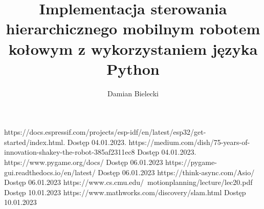 \documentclass[12pt,twoside]{article}
\author{Damian Bielecki}
\title{Implementacja sterowania hierarchicznego mobilnym robotem kołowym z wykorzystaniem języka Python}
\begin{document}
\maketitle

\blankpage

\tableofcontents
\clearpage
\blankpage










	


\clearpage
	
	
\begin{thebibliography}{4}
	 https://docs.espressif.com/projects/esp-idf/en/latest/esp32/get-started/index.html. Dostęp 04.01.2023.
	 https://medium.com/dish/75-years-of-innovation-shakey-the-robot-385af2311ec8 Dostęp 04.01.2023.
	 https://www.pygame.org/docs/ Dostęp 06.01.2023
	 https://pygame-gui.readthedocs.io/en/latest/ Dostęp 06.01.2023
	 https://think-async.com/Asio/ Dostęp 06.01.2023
	 https://www.cs.cmu.edu/~motionplanning/lecture/lec20.pdf Dostęp 10.01.2023
	 https://www.mathworks.com/discovery/slam.html Dostęp 10.01.2023
\end{thebibliography}
	
\clearpage
	
\makesummary
\end{document}

